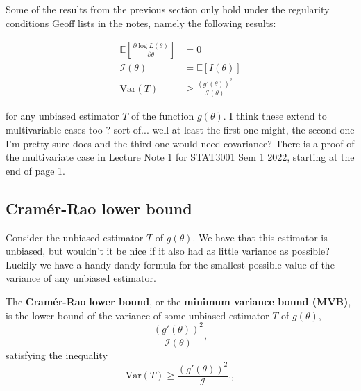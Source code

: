 
Some of the results from the previous section only hold under the regularity conditions Geoff lists in the notes, namely the following results:

\begin{align*}\label{not thm:reg conds I}
    \mathbb{E}\left[\frac{\partial \log L(\theta)}{\partial \theta}\right] &= 0\\
    \mathscr{I}(\theta) &= \mathbb{E}[I(\theta)]\\
    \text{Var}(T) &\geq \frac{(g'(\theta))^2}{\mathscr{I}(\theta)}
\end{align*}

for any unbiased estimator \(T\) of the function \(g(\theta)\). 
I think these extend to multivariable cases too ? sort of... well at least the first one might, the second one I'm pretty sure does and the third one would need covariance?
There is a proof of the multivariate case in Lecture Note 1 for STAT3001 Sem 1 2022, starting at the end of page 1.

\subsection{Cram\'{e}r-Rao lower bound}\label{subsec:Cramer-Rao}

Consider the unbiased estimator \(T\) of \(g(\theta)\). 
We have that this estimator is unbiased, but wouldn't it be nice if it also had as little variance as possible?
Luckily we have a handy dandy formula for the smallest possible value of the variance of any unbiased estimator.

\begin{definition}\label{defn:cramer}
    The \textbf{Cram\'{e}r-Rao} \textbf{lower bound}, or the \textbf{minimum variance bound (MVB)}, is the lower bound of the variance of some unbiased estimator \(T\) of \(g(\theta)\), 
    \begin{equation}\label{eq:MVB}
        \frac{\left(g'(\theta)\right)^2}{\mathscr{I}(\theta)},
    \end{equation}
    satisfying the inequality 
    \begin{equation}\label{eq:MVB inequality}
        \text{Var}(T) \geq \frac{\left(g'(\theta)\right)^2}{\mathscr{I}}.,
    \end{equation}
\end{definition}

